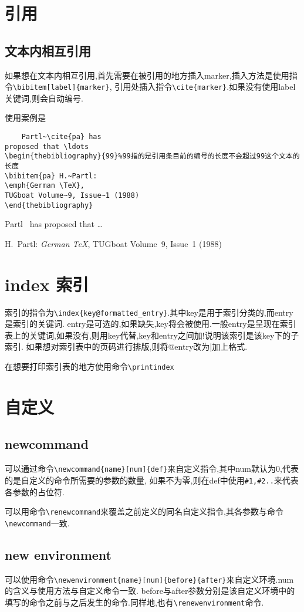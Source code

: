 \documentclass[a4paper,11pt]{article}%
\begin{document}
\section{引用}
\subsection{文本内相互引用}
如果想在文本内相互引用,首先需要在被引用的地方插入marker,插入方法是使用指令\verb+\bibitem[label]{marker}+,
引用处插入指令\verb+\cite{marker}+.如果没有使用label关键词,则会自动编号.

使用案例是
\begin{verbatim}
    Partl~\cite{pa} has
proposed that \ldots
\begin{thebibliography}{99}%99指的是引用条目前的编号的长度不会超过99这个文本的长度
\bibitem{pa} H.~Partl:
\emph{German \TeX},
TUGboat Volume~9, Issue~1 (1988)
\end{thebibliography}
\end{verbatim}
Partl~\cite{pa} has
proposed that \ldots
\begin{thebibliography}{99}
 H.~Partl:
\emph{German \TeX},
TUGboat Volume~9, Issue~1 (1988)
\end{thebibliography}
\section{index 索引}
索引的指令为\verb+\index{key@formatted_entry}+.其中key是用于索引分类的,而entry是索引的关键词.
entry是可选的,如果缺失,key将会被使用.一般entry是呈现在索引表上的关键词,如果没有,则用key代替,key和entry之间加!说明该索引是该key下的子索引.
如果想对索引表中的页码进行排版,则将@entry改为|加上格式.

在想要打印索引表的地方使用命令\verb+\printindex+

\section{自定义}
\subsection{newcommand}
可以通过命令\verb+\newcommand{name}[num]{def}+来自定义指令,其中num默认为0,代表的是自定义的命令所需要的参数的数量,
如果不为零,则在def中使用\verb+#1,#2..+来代表各参数的占位符.

可以用命令\verb+\renewcommand+来覆盖之前定义的同名自定义指令,其各参数与命令\verb+\newcommand+一致.
\subsection{new environment}
可以使用命令\verb+\newenvironment{name}[num]{before}{after}+来自定义环境.num的含义与使用方法与自定义命令一致.
before与after参数分别是该自定义环境中的填写的命令之前与之后发生的命令.同样地,也有\verb+\renewenvironment+命令.
\end{document}
